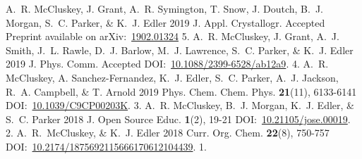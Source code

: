 \begin{cvpubys}
  \cvpuby
    {A.~R. McCluskey, J. Grant, A.~R. Symington, T. Snow, J. Doutch, B.~J. Morgan, S.~C. Parker, \& K.~J. Edler}
    {2019}
    {J. Appl. Crystallogr.}
    {Accepted}
    {Preprint available on arXiv:~\href{https://arxiv.org/abs/1902.01324}{1902.01324}}
    {5.}
  \cvpuby
    {A.~R. McCluskey, J. Grant, A.~J. Smith, J.~L. Rawle, D.~J. Barlow, M.~J. Lawrence, S.~C. Parker, \& K.~J. Edler}
    {2019}
    {J. Phys. Comm.}
    {Accepted}
    {DOI:~\href{https://doi.org/10.1088/2399-6528/ab12a9}{10.1088/2399-6528/ab12a9}.}
    {4.}
  \cvpuby
    {A.~R. McCluskey, A. Sanchez-Fernandez, K.~J. Edler, S.~C. Parker, A.~J. Jackson, R.~A. Campbell, \& T. Arnold}
    {2019}
    {Phys. Chem. Chem. Phys.}
    {\textbf{21}(11), 6133-6141}
    {DOI:~\href{https://doi.org/10.1039/C9CP00203K}{10.1039/C9CP00203K}.}
    {3.}
  \cvpuby
    {A.~R. McCluskey, B.~J. Morgan, K.~J. Edler, \& S.~C. Parker}
    {2018}
    {J. Open Source Educ.}
    {\textbf{1}(2), 19-21}
    {DOI:~\href{http://doi.org/10.21105/jose.00019}{10.21105/jose.00019}.}
    {2.}
  \cvpuby
    {A.~R.~McCluskey, \& K.~J. Edler}
    {2018}
    {Curr. Org. Chem.}
    {\textbf{22}(8), 750-757}
    {DOI:~\href{http://doi.org/10.2174/1875692115666170612104439}{10.2174/1875692115666170612104439}.}
    {1.}
\end{cvpubys}
